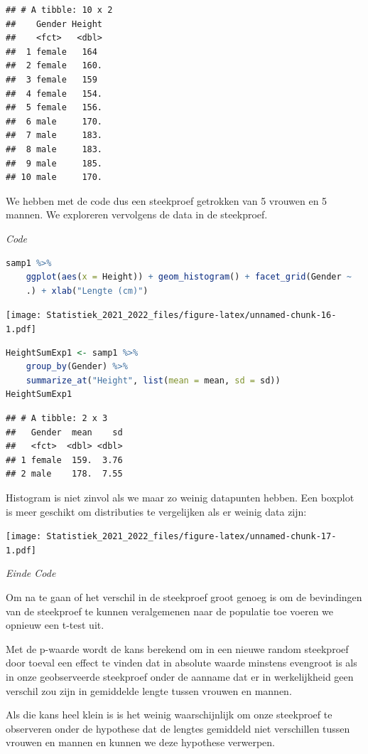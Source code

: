 \documentclass[
  12pt,dutch,coursenotes]{book}
\theoremstyle{definition}
\theoremstyle{definition}
\theoremstyle{definition}
\theoremstyle{definition}
\theoremstyle{remark}
\begin{document}
\begin{lstlisting}
## # A tibble: 10 x 2
##    Gender Height
##    <fct>   <dbl>
##  1 female   164 
##  2 female   160.
##  3 female   159 
##  4 female   154.
##  5 female   156.
##  6 male     170.
##  7 male     183.
##  8 male     183.
##  9 male     185.
## 10 male     170.
\end{lstlisting}

We hebben met de code dus een steekproef getrokken van 5 vrouwen en 5 mannen.
We exploreren vervolgens de data in de steekproef.

\emph{Code}

\begin{lstlisting}[language=R]
samp1 %>%
    ggplot(aes(x = Height)) + geom_histogram() + facet_grid(Gender ~
    .) + xlab("Lengte (cm)")
\end{lstlisting}

\texttt{[image: Statistiek\_2021\_2022\_files/figure-latex/unnamed-chunk-16-1.pdf]}

\begin{lstlisting}[language=R]
HeightSumExp1 <- samp1 %>%
    group_by(Gender) %>%
    summarize_at("Height", list(mean = mean, sd = sd))
HeightSumExp1
\end{lstlisting}

\begin{lstlisting}
## # A tibble: 2 x 3
##   Gender  mean    sd
##   <fct>  <dbl> <dbl>
## 1 female  159.  3.76
## 2 male    178.  7.55
\end{lstlisting}

Histogram is niet zinvol als we maar zo weinig datapunten hebben. Een boxplot is meer geschikt om distributies te vergelijken als er weinig data zijn:

\texttt{[image: Statistiek\_2021\_2022\_files/figure-latex/unnamed-chunk-17-1.pdf]}

\emph{Einde Code}

Om na te gaan of het verschil in de steekproef groot genoeg is om de bevindingen van de steekproef te kunnen veralgemenen naar de populatie toe voeren we opnieuw een t-test uit.

Met de p-waarde wordt de kans berekend om in een nieuwe random steekproef door toeval een effect te vinden dat in absolute waarde minstens evengroot is als in onze geobserveerde steekproef onder de aanname dat er in werkelijkheid geen verschil zou zijn in gemiddelde lengte tussen vrouwen en mannen.

Als die kans heel klein is is het weinig waarschijnlijk om onze steekproef te observeren onder de hypothese dat de lengtes gemiddeld niet verschillen tussen vrouwen en mannen en kunnen we deze hypothese verwerpen.
\end{document}
